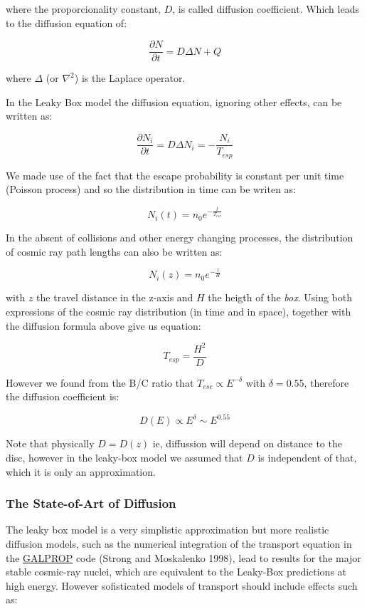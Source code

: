 \documentclass[
  letterpaper,
  DIV=11,
  numbers=noendperiod]{scrreprt}
\begin{document}
where the proporcionality constant, \(D\), is called diffusion
coefficient. Which leads to the diffusion equation of:

\[\frac{\partial N}{\partial t} =  D\Delta N + Q \]

where \(\Delta\) (or \(\nabla^2\)) is the Laplace operator.

In the Leaky Box model the diffusion equation, ignoring other effects,
can be written as:

\[\frac{\partial N_i}{\partial t} = D\Delta N_i =-\frac{N_i}{T_{esp}}\]

We made use of the fact that the escape probability is constant per unit
time (Poisson process) and so the distribution in time can be writen as:

\[N_i(t) = n_0 e^{-\frac{t}{T_{esc}}}\]

In the absent of collisions and other energy changing processes, the
distribution of cosmic ray path lengths can also be written as:

\[N_i(z) = n_0 e^{-\frac{z}{H}}\]

with \(z\) the travel distance in the z-axis and \(H\) the heigth of the
\emph{box}. Using both expressions of the cosmic ray distribution (in
time and in space), together with the diffusion formula above give us
equation:

\[T_{esp} = \frac{H^2}{D} \]

However we found from the B/C ratio that \(T_{esc} \propto E^{-\delta}\)
with \(\delta = 0.55\), therefore the diffusion coefficient is:

\[ D(E) \propto E^{\delta} \sim E^{0.55}\]

Note that physically \(D = D(z)\) ie, diffussion will depend on distance
to the disc, however in the leaky-box model we assumed that \(D\) is
independent of that, which it is only an approximation.

\subsubsection*{The State-of-Art of
Diffusion}\label{the-state-of-art-of-diffusion}

The leaky box model is a very simplistic approximation but more
realistic diffusion models, such as the numerical integration of the
transport equation in the \href{https://galprop.stanford.edu/}{GALPROP}
code (Strong and Moskalenko 1998), lead to results for the major stable
cosmic-ray nuclei, which are equivalent to the Leaky-Box predictions at
high energy. However sofisticated models of transport should include
effects such as:
\end{document}
